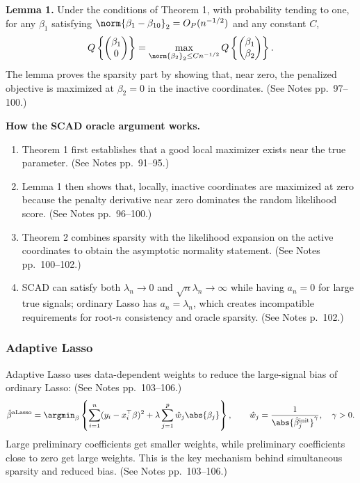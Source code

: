 \textbf{Lemma 1.}
Under the conditions of Theorem 1, with probability tending to one, for any $\beta_1$ satisfying $\norm{\beta_1-\beta_{10}}_2=O_P(n^{-1/2})$ and any constant $C$,
\[
Q\left\{\begin{pmatrix}\beta_1\\0\end{pmatrix}\right\}
=
\max_{\norm{\beta_2}_2\le Cn^{-1/2}}
Q\left\{\begin{pmatrix}\beta_1\\\beta_2\end{pmatrix}\right\}.
\]
The lemma proves the sparsity part by showing that, near zero, the penalized objective is maximized at $\beta_2=0$ in the inactive coordinates. (See Notes pp.~97--100.)

\begin{mybox}
\textbf{How the SCAD oracle argument works.}
\begin{enumerate}
    \item Theorem 1 first establishes that a good local maximizer exists near the true parameter. (See Notes pp.~91--95.)
    \item Lemma 1 then shows that, locally, inactive coordinates are maximized at zero because the penalty derivative near zero dominates the random likelihood score. (See Notes pp.~96--100.)
    \item Theorem 2 combines sparsity with the likelihood expansion on the active coordinates to obtain the asymptotic normality statement. (See Notes pp.~100--102.)
    \item SCAD can satisfy both $\lambda_n\to0$ and $\sqrt n\lambda_n\to\infty$ while having $a_n=0$ for large true signals; ordinary Lasso has $a_n=\lambda_n$, which creates incompatible requirements for root-$n$ consistency and oracle sparsity. (See Notes p.~102.)
\end{enumerate}
\end{mybox}

\subsubsection{Adaptive Lasso}
Adaptive Lasso uses data-dependent weights to reduce the large-signal bias of ordinary Lasso: (See Notes pp.~103--106.)
\[
\hat\beta^{\mathrm{aLasso}}
=\argmin_\beta
\left\{
\sum_{i=1}^n(y_i-x_i^\top\beta)^2
+\lambda\sum_{j=1}^p \hat w_j\abs{\beta_j}
\right\},
\qquad
\hat w_j=\frac{1}{\abs{\hat\beta_j^{\mathrm{init}}}^{\gamma}},
\quad
\gamma>0.
\]
Large preliminary coefficients get smaller weights, while preliminary coefficients close to zero get large weights. This is the key mechanism behind simultaneous sparsity and reduced bias. (See Notes pp.~103--106.)

